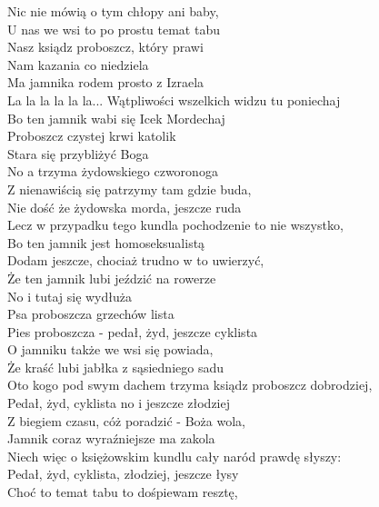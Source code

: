
\begin{flushleft}
Nic nie mówią o tym chłopy ani baby, \\
U nas we wsi to po prostu temat tabu \\
Nasz ksiądz proboszcz, który prawi \\
Nam kazania co niedziela \tab{}\\
Ma jamnika rodem prosto z Izraela \\
La la la la la la... \tab{}
\vskip 3mm
Wątpliwości wszelkich widzu tu poniechaj \\
Bo ten jamnik wabi się Icek Mordechaj \\
Proboszcz czystej krwi katolik \\
Stara się przybliżyć Boga \\
No a trzyma żydowskiego czworonoga \\
\vskip 3mm
Z nienawiścią się patrzymy tam gdzie buda, \\
Nie dość że żydowska morda, jeszcze ruda \\
Lecz w przypadku tego kundla pochodzenie to nie wszystko, \\
Bo ten jamnik jest homoseksualistą \\
\vskip 3mm
Dodam jeszcze, chociaż trudno w to uwierzyć, \\
Że ten jamnik lubi jeździć na rowerze \\
No i tutaj się wydłuża \\
Psa proboszcza grzechów lista \\
Pies proboszcza - pedał, żyd, jeszcze cyklista \\
\vskip 3mm
O jamniku także we wsi się powiada, \\
Że kraść lubi jabłka z sąsiedniego sadu \\
Oto kogo pod swym dachem trzyma ksiądz proboszcz dobrodziej, \\
Pedał, żyd, cyklista no i jeszcze złodziej \\
\vskip 3mm
Z biegiem czasu, cóż poradzić - Boża wola, \\
Jamnik coraz wyraźniejsze ma zakola \\
Niech więc o księżowskim kundlu cały naród prawdę słyszy: \\
Pedał, żyd, cyklista, złodziej, jeszcze łysy \\
\vskip 3mm
Choć to temat tabu to dośpiewam resztę, \\

\end{flushleft}
